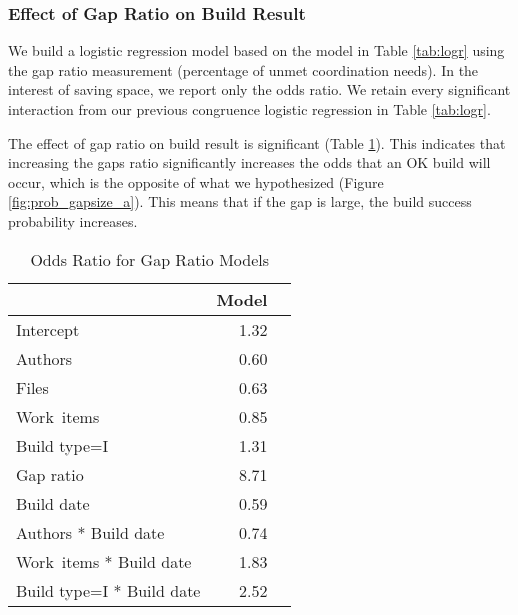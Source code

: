 \subsubsection{Effect of Gap Ratio on Build Result}
\label{sec:gapsizeresult}
We build a logistic regression model based on the model in Table \ref{tab:logr} using the gap ratio measurement (percentage of unmet coordination needs). In the interest of saving space, we report only the odds ratio. We retain every significant interaction from our previous congruence logistic regression in Table \ref{tab:logr}.

The effect of gap ratio on build result is significant (Table \ref{tab:oddsratio_gapsize}). This indicates that increasing the gaps ratio significantly increases the odds that an OK build will occur, which is the opposite of what we hypothesized (Figure \ref{fig:prob_gapsize_a}). This means that if the gap is large, the build success probability increases.

\begin{table}[t]
\begin{center}
\begin{tabular}{lrr}
  \toprule
 & Model\\ 
  \midrule
Intercept & 1.32 \\ 
  Authors &  0.60 \\ 
  Files &  0.63 \\ 
  Work~items  & 0.85 \\ 
  Build type=I  & 1.31 \\ 
  Gap ratio  & 8.71 \\ 
  Build date  & 0.59 \\ 
  Authors * Build date & 0.74 \\ 
  Work~items * Build date  & 1.83 \\ 
  Build type=I * Build date  & 2.52 \\ 
   \bottomrule
\end{tabular}
\caption{Odds Ratio for Gap Ratio Models}
\label{tab:oddsratio_gapsize}
\end{center}
\end{table}




